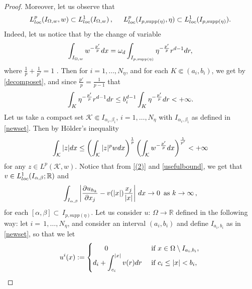 \documentclass[10pt,a4paper]{amsart}
\def\de{{\rm d}}
\newcommand{\R}{\bbR}
\newcommand{\bbR}{{\mathbb{R}}}
\newcommand{\hol}[1]{\"{#1}}
\newcommand{\supp}{\mathrm{supp}}
\begin{document}
\begin{proof}
Moreover, let us observe that
\begin{equation*}\label{(3)}
L^{p}_{\rm{loc}}(I_{\Omega,w},w)\subset L^1_{\rm{loc}}(I_{\Omega,w})\,, \hskip 0,5cm L^{p}_{\rm{loc}}(I_{p,\supp(\eta)},\eta)\subset L^1_{\rm{loc}}(I_{p,\supp(\eta)}).
\end{equation*}
Indeed, let us notice that by the change of variable
\begin{align*}
\displaystyle\int_{I_{\Omega,w}} w^{-\frac{p'}{p}} \de x=\omega_{d}\displaystyle\int_{I_{p,\supp(\eta)}} \eta^{-\frac{p'}{p}}r^{d-1} \de r,
\end{align*}
where $\frac{1}{p}+\frac{1}{p'}=1$ . Then for $i=1,\ldots, N_{\eta}$, and for each $K\Subset (a_{i},b_{i})$, we get by \eqref{decomposet}, and since $\frac{p'}{p}=\frac{1}{p-1}$ that
\begin{align*}
\displaystyle\int_{K} \eta^{-\frac{p'}{p}}r^{d-1} \de r\leq b_{i}^{d-1}\displaystyle\int_{K} \eta^{-\frac{p'}{p}}\de r<+\infty.
\end{align*}
Let us take a compact set $\mathcal{K}\Subset I_{\alpha_{i},\beta_{i}}$, $i=1,\ldots, N_{\eta}$ with $I_{\alpha_{i},\beta_{i}}$ as defined in \eqref{newset}. Then by H\hol{o}lder's inequality
\begin{align}
\label{usefulbound}
\displaystyle\int_{\mathcal{K}}\vert  z\vert \de x\leq \left(\displaystyle\int_{\mathcal{K}}\vert  z\vert^{p}w\de x\right)^{\frac{1}{p}}\left(\displaystyle\int_{\mathcal{K}} w^{-\frac{p'}{p}} \de x\right)^{\frac{1}{p'}}<+\infty
\end{align}
for any $z\in L^{p}(\mathcal{K},w)$. Notice that from \eqref{(2)} and \eqref{usefulbound}, we get that $v\in L^1_{\rm{loc}}(I_{\alpha,\beta};\mathbb{R})$ and
\begin{equation*}\label{4}
\displaystyle\int_{I_{\alpha,\beta}} \left\vert \frac{\partial u_{h_k}}{\partial x_{j}}- v(\vert x\vert)\frac{x_{j}}{\vert x\vert}\right\vert \,\de x\rightarrow 0\, \text{ as }k\to\infty\,,
\end{equation*}
for each $[\alpha,\beta]\subset\,I_{p,{\mathrm supp}(\eta)}$.
Let us consider $u:\,\Omega\to\R$ defined in the following way:  let $i=\,1,\dots,N_\eta$, and consider an interval $(a_{i}, b_{i})$ and define $I_{a_{i},b_{i}}$ as in \eqref{newset}, so that we let
\begin{equation*}
u^{i}(x):=
\begin{cases}
\ \ \ \ \ 0 \ \ \ \ &\text{ if } x\in\Omega\setminus I_{a_{i},b_{i}},\,
\\
\displaystyle d_{i}+\int_{c_{i}}^{\vert x\vert}v(r)\de r&\text{ if } c_{i}\leq \vert x\vert<b_{i},\\

\end{cases}
\end{equation*}
\end{proof}
\end{document}
